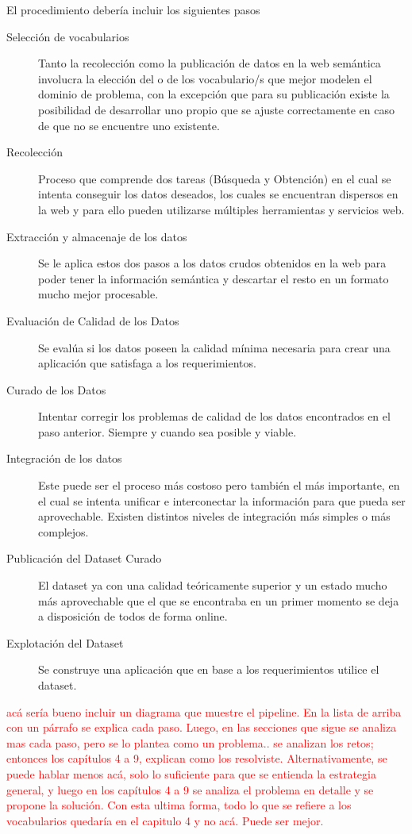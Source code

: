 El procedimiento debería incluir los siguientes pasos  

\begin{description}
\item[Selección de vocabularios ] Tanto la recolección como la publicación de datos en la web semántica involucra la elección del o de los vocabulario/s que mejor modelen el dominio de problema, con la excepción que para su publicación existe la posibilidad de desarrollar uno propio que se ajuste correctamente en caso de que no se encuentre uno existente. 
\item[Recolección  ] Proceso que comprende dos tareas (Búsqueda y Obtención) en el cual se intenta conseguir los datos deseados, los cuales se encuentran dispersos en la web y para ello pueden utilizarse múltiples herramientas y servicios web.
\item[Extracción y almacenaje de los datos] Se le aplica estos dos pasos a los datos crudos obtenidos en la web para poder tener la información semántica y descartar el resto en un formato mucho mejor procesable.
\item[Evaluación de Calidad de los Datos] Se evalúa si los datos poseen la calidad mínima necesaria para crear una aplicación que satisfaga a los requerimientos.
\item[Curado de los Datos] Intentar corregir los problemas de calidad de los datos encontrados en el paso anterior. Siempre y cuando sea posible y viable.
\item[Integración de los datos] Este puede ser el proceso más costoso pero también el más importante, en el cual se intenta unificar e interconectar la información para que pueda ser aprovechable. Existen distintos niveles de integración más simples o más complejos.
\item[Publicación del Dataset Curado] El dataset ya con una calidad teóricamente superior y un estado mucho más aprovechable que el que se encontraba en un primer momento se deja a disposición de todos de forma online.  
\item[Explotación del Dataset] Se construye una aplicación que en base a los requerimientos utilice el dataset. 
\end{description}

\begin{framed}
\textcolor{red}{acá sería bueno incluir un diagrama que muestre el pipeline. En la lista de arriba con un párrafo se explica cada paso. Luego, en las secciones que sigue se analiza mas cada paso, pero se lo plantea como un problema.. se analizan los retos; entonces los capítulos 4 a 9, explican como los resolviste. Alternativamente, se puede hablar menos acá, solo lo suficiente para que se entienda la estrategia general, y luego en los capítulos 4 a 9 se analiza el problema en detalle y se propone la solución. Con esta ultima forma, todo lo que se refiere a los vocabularios quedaría en el capitulo 4 y no acá. Puede ser mejor.}
\end{framed}

